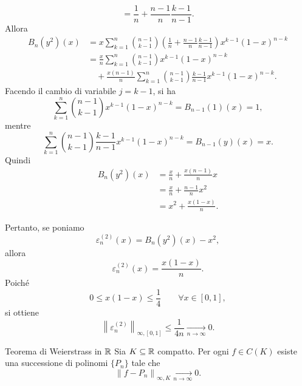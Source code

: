 \documentclass[a4paper]{article}
\begin{document}
\begin{enumerate}
\[            =
            \frac{1}{n}
            +
            \frac{n-1}{n}\frac{k-1}{n-1}.
        \]
        Allora
        \begin{align*}
            B_n(y^2)(x)
            &=
            x
            \sum_{k=1}^{n}
            \binom{n-1}{k-1}
            \left(
                \frac{1}{n}
                +
                \frac{n-1}{n}\frac{k-1}{n-1}
            \right)
            x^{k-1}(1-x)^{n-k} \\
            &=
            \frac{x}{n}
            \sum_{k=1}^{n}
            \binom{n-1}{k-1}
            x^{k-1}(1-x)^{n-k} \\
            &\quad
            +
            \frac{x(n-1)}{n}
            \sum_{k=1}^{n}
            \binom{n-1}{k-1}
            \frac{k-1}{n-1}
            x^{k-1}(1-x)^{n-k}.
        \end{align*}
        Facendo il cambio di variabile \(j=k-1\), si ha
        \[
            \sum_{k=1}^{n}
            \binom{n-1}{k-1}
            x^{k-1}(1-x)^{n-k}
            =
            B_{n-1}(1)(x)
            =
            1,
        \]
        mentre
        \[
            \sum_{k=1}^{n}
            \binom{n-1}{k-1}
            \frac{k-1}{n-1}
            x^{k-1}(1-x)^{n-k}
            =
            B_{n-1}(y)(x)
            =
            x.
        \]
        Quindi
        \begin{align*}
            B_n(y^2)(x)
            &=
            \frac{x}{n}
            +
            \frac{x(n-1)}{n}x \\
            &=
            \frac{x}{n}
            +
            \frac{n-1}{n}x^2 \\
            &=
            x^2+\frac{x(1-x)}{n}.
        \end{align*}

        Pertanto, se poniamo
        \[
            \varepsilon_n^{(2)}(x)
            =
            B_n(y^2)(x)-x^2,
        \]
        allora
        \[
            \varepsilon_n^{(2)}(x)
            =
            \frac{x(1-x)}{n}.
        \]
        Poiché
        \[
            0\leq x(1-x)\leq \frac{1}{4}
            \qquad
            \forall x\in[0,1],
        \]
        si ottiene
        \[
            \left\|\varepsilon_n^{(2)}\right\|_{\infty,[0,1]}
            \leq
            \frac{1}{4n}
            \xrightarrow[n\to\infty]{}
            0.
        \]
\end{enumerate}

\begin{snippettheorem}{Teorema di Weierstrass in \(\mathbb{R}\)}
    Sia \(K\subseteq \mathbb{R}\) compatto. Per ogni \(f\in C(K)\) esiste una successione di polinomi \(\{P_n\}\) tale che
    \[
        \left\|f-P_n\right\|_{\infty,K}
        \xrightarrow[n\to\infty]{}
        0.
    \]
\end{snippettheorem}
\end{document}
